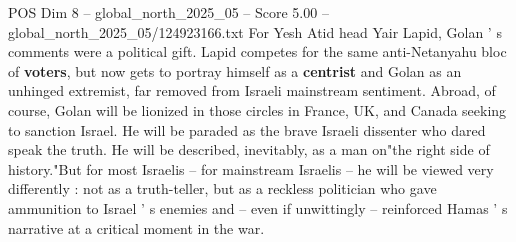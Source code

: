 \begin{textsample}{POS Dim 8 – global\_north\_2025\_05 – Score 5.00 – global\_north\_2025\_05/124923166.txt}
For Yesh Atid head Yair Lapid, Golan ' s comments were a political gift.
Lapid competes for the same anti-Netanyahu bloc of \textbf{voters}, but now gets to portray himself as a \textbf{centrist} and Golan as an unhinged extremist, far removed from Israeli mainstream sentiment.
Abroad, of course, Golan will be lionized in those circles in France, UK, and Canada seeking to sanction Israel.
He will be paraded as the brave Israeli dissenter who dared speak the truth.
He will be described, inevitably, as a man on"the right side of history."But for most Israelis -- for mainstream Israelis -- he will be viewed very differently : not as a truth-teller, but as a reckless politician who gave ammunition to Israel ' s enemies and -- even if unwittingly -- reinforced Hamas ' s narrative at a critical moment in the war.

\end{textsample}
